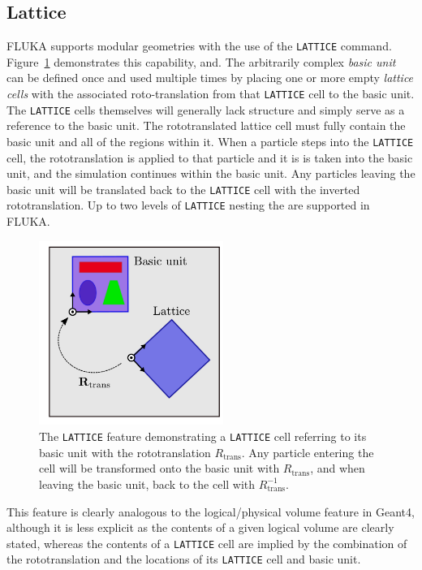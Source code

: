 \documentclass[final,5p,times,twocolumn]{elsarticle}
\newcommand{\fluka}[1]{\texttt{\MakeUppercase{#1}}}
\begin{document}
\subsection{Lattice}

FLUKA supports modular geometries with the use of the \fluka{lattice}
command. Figure~\ref{fig:lattice} demonstrates this capability, and. The
arbitrarily complex \textit{basic unit} can be defined once and used
multiple times by placing one or more empty \textit{lattice cells} with the
associated roto-translation from that \fluka{lattice} cell to the basic
unit. The \fluka{lattice} cells themselves will generally lack structure
and simply serve as a reference to the basic unit. The rototranslated
lattice cell must fully contain the basic unit and all of the regions
within it. When a particle steps into the \fluka{lattice} cell, the
rototranslation is applied to that particle and it is is taken into the
basic unit, and the simulation continues within the basic unit. Any
particles leaving the basic unit will be translated back to the
\fluka{lattice} cell with the inverted rototranslation. Up to two
levels of \fluka{lattice} nesting the are supported in FLUKA.

\begin{figure}[hbtp]
\begin{center}
\includegraphics[width=6cm]{./diagrams/lattice}
\caption{The \fluka{lattice} feature demonstrating a \fluka{lattice} cell
  referring to its basic unit with the rototranslation $R_\textrm{trans}$.
  Any particle entering the cell will be transformed onto the basic unit
  with $R_\textrm{trans}$, and when leaving the basic unit, back to the cell
  with $R_\textrm{trans}^{-1}$.}
\label{fig:lattice}
\end{center}
\end{figure}

This feature is clearly analogous to the logical/physical volume feature in
Geant4, although it is less explicit as the contents of a given logical
volume are clearly stated, whereas the contents of a \fluka{lattice} cell
are implied by the combination of the rototranslation and the locations of
its \fluka{lattice} cell and basic unit.
\end{document}

